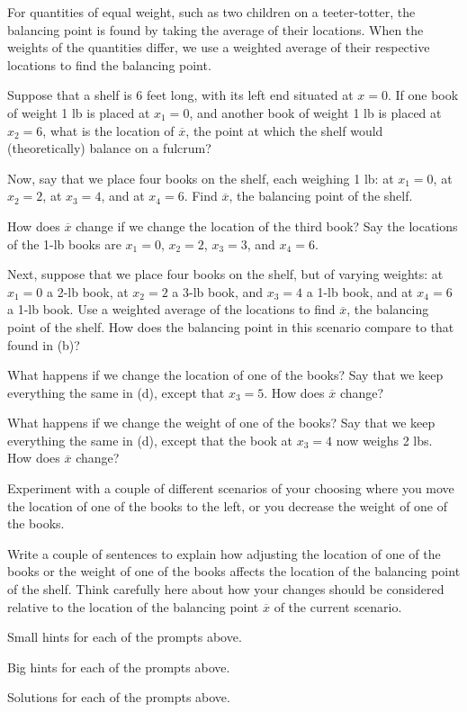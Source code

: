 \begin{activity} \label{A:6.3.2} For quantities of equal weight, such as two children on a teeter-totter, the balancing point is found by taking the average of their locations.  When the weights of the quantities differ, we use a weighted average of their respective locations to find the balancing point. 
\ba
	\item Suppose that a shelf is 6 feet long, with its left end situated at $x = 0$.  If one book of weight 1 lb is placed at $x_1 = 0$, and another book of weight 1 lb is placed at $x_2 = 6$, what is the location of $\overline{x}$, the point at which the shelf would (theoretically) balance on a fulcrum?
	\item Now, say that we place four books on the shelf, each weighing 1 lb:  at $x_1 = 0$, at $x_2 = 2$, at $x_3 = 4$, and at $x_4 = 6$.  Find $\overline{x}$, the balancing point of the shelf.
	\item How does $\overline{x}$ change if we change the location of the third book?  Say the locations of the 1-lb books are  $x_1 = 0$, $x_2 = 2$, $x_3 = 3$, and $x_4 = 6$.  
	\item Next, suppose that we place four books on the shelf, but of varying weights:  at $x_1 = 0$ a 2-lb book, at $x_2 = 2$ a 3-lb book, and $x_3 = 4$ a 1-lb book, and at $x_4 = 6$ a 1-lb book.  Use a weighted average of the locations to find $\overline{x}$, the balancing point of the shelf.  How does the balancing point in this scenario compare to that found in (b)?
	\item What happens if we change the location of one of the books?  Say that we keep everything the same in (d), except that $x_3 = 5$.  How does $\overline{x}$ change?  
	\item What happens if we change the weight of one of the books?  Say that we keep everything the same in (d), except that the book at $x_3 = 4$ now weighs 2 lbs.  How does $\overline{x}$ change?
	\item Experiment with a couple of different scenarios of your choosing where you move the location of one of the books to the left, or you decrease the weight of one of the books.
	\item Write a couple of sentences to explain how adjusting the location of one of the books or the weight of one of the books affects the location of the balancing point of the shelf.  Think carefully here about how your changes should be considered relative to the location of the balancing point $\overline{x}$ of the current scenario.
\ea

\end{activity}
\begin{smallhint}
\ba
	\item Small hints for each of the prompts above.
\ea
\end{smallhint}
\begin{bighint}
\ba
	\item Big hints for each of the prompts above.
\ea
\end{bighint}
\begin{activitySolution}
\ba
	\item Solutions for each of the prompts above.
\ea
\end{activitySolution}
\aftera